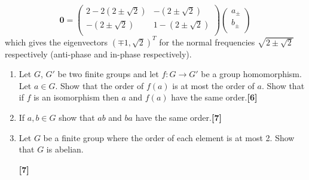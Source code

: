 \documentclass[a4paper]{article}
\begin{document}
\begin{ans}
\begin{enumerate}[label=(\alph*)]
\begin{enumerate}[label=(\roman*)]
$$\boldsymbol{0}=\begin{pmatrix}2-2(2\pm\sqrt{2})&-(2\pm\sqrt{2})\\-(2\pm\sqrt{2})&1-(2\pm\sqrt{2})\\\end{pmatrix}\begin{pmatrix}a_\pm\\b_\pm\\\end{pmatrix}$$
which gives the eigenvectors $(\mp1,\sqrt{2})^T$ for the normal frequencies $\sqrt{2\pm\sqrt{2}}$ respectively (anti-phase and in-phase respectively).
\end{enumerate}
\end{enumerate}
\end{ans}
\newpage
\begin{qns}\leavevmode
\begin{enumerate}[label=(\alph*)]
\item  Let $G$, $G'$ be two finite groups and let $f : G\rightarrow G'$ be a group homomorphism. Let $a\in G$. Show that the order of $f(a)$ is at most the order of $a$. Show that if $f$ is an isomorphism then $a$ and $f(a)$ have the same order.\hfill\textbf{[6]}
\item If $a,b\in G$ show that $ab$ and $ba$ have the same order.\hfill\textbf{[7]}
\item Let $G$ be a finite group where the order of each element is at most 2. Show that $G$ is abelian.

\hfill\textbf{[7]}
\end{enumerate}
\end{qns}
\end{document}
